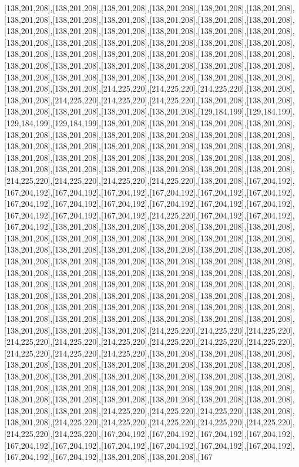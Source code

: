 [138,201,208],[138,201,208],[138,201,208],[138,201,208],[138,201,208],[138,201,208],[138,201,208],[138,201,208],[138,201,208],[138,201,208],[138,201,208],[138,201,208],[138,201,208],[138,201,208],[138,201,208],[138,201,208],[138,201,208],[138,201,208],[138,201,208],[138,201,208],[138,201,208],[138,201,208],[138,201,208],[138,201,208],[138,201,208],[138,201,208],[138,201,208],[138,201,208],[138,201,208],[138,201,208],[138,201,208],[138,201,208],[138,201,208],[138,201,208],[138,201,208],[138,201,208],[138,201,208],[138,201,208],[138,201,208],[138,201,208],[138,201,208],[138,201,208],[138,201,208],[138,201,208],[214,225,220],[214,225,220],[214,225,220],[138,201,208],[138,201,208],[214,225,220],[214,225,220],[214,225,220],[138,201,208],[138,201,208],[138,201,208],[138,201,208],[138,201,208],[138,201,208],[129,184,199],[129,184,199],[129,184,199],[129,184,199],[138,201,208],[138,201,208],[138,201,208],[138,201,208],[138,201,208],[138,201,208],[138,201,208],[138,201,208],[138,201,208],[138,201,208],[138,201,208],[138,201,208],[138,201,208],[138,201,208],[138,201,208],[138,201,208],[138,201,208],[138,201,208],[138,201,208],[138,201,208],[138,201,208],[138,201,208],[138,201,208],[138,201,208],[138,201,208],[138,201,208],[138,201,208],[138,201,208],[214,225,220],[214,225,220],[214,225,220],[214,225,220],[138,201,208],[167,204,192],[167,204,192],[167,204,192],[167,204,192],[167,204,192],[167,204,192],[167,204,192],[167,204,192],[167,204,192],[167,204,192],[167,204,192],[167,204,192],[167,204,192],[167,204,192],[167,204,192],[167,204,192],[214,225,220],[167,204,192],[167,204,192],[167,204,192],[138,201,208],[138,201,208],[138,201,208],[138,201,208],[138,201,208],[138,201,208],[138,201,208],[138,201,208],[138,201,208],[138,201,208],[138,201,208],[138,201,208],[138,201,208],[138,201,208],[138,201,208],[138,201,208],[138,201,208],[138,201,208],[138,201,208],[138,201,208],[138,201,208],[138,201,208],[138,201,208],[138,201,208],[138,201,208],[138,201,208],[138,201,208],[138,201,208],[138,201,208],[138,201,208],[138,201,208],[138,201,208],[138,201,208],[138,201,208],[138,201,208],[138,201,208],[138,201,208],[138,201,208],[138,201,208],[138,201,208],[138,201,208],[138,201,208],[138,201,208],[138,201,208],[138,201,208],[138,201,208],[138,201,208],[138,201,208],[138,201,208],[138,201,208],[138,201,208],[138,201,208],[138,201,208],[138,201,208],[138,201,208],[138,201,208],[214,225,220],[214,225,220],[214,225,220],[214,225,220],[214,225,220],[214,225,220],[214,225,220],[214,225,220],[214,225,220],[214,225,220],[214,225,220],[214,225,220],[138,201,208],[138,201,208],[138,201,208],[138,201,208],[138,201,208],[138,201,208],[138,201,208],[138,201,208],[138,201,208],[138,201,208],[138,201,208],[138,201,208],[138,201,208],[138,201,208],[138,201,208],[138,201,208],[138,201,208],[138,201,208],[138,201,208],[138,201,208],[138,201,208],[138,201,208],[138,201,208],[138,201,208],[138,201,208],[138,201,208],[138,201,208],[138,201,208],[138,201,208],[214,225,220],[214,225,220],[214,225,220],[138,201,208],[138,201,208],[214,225,220],[214,225,220],[214,225,220],[214,225,220],[214,225,220],[214,225,220],[214,225,220],[167,204,192],[167,204,192],[167,204,192],[167,204,192],[167,204,192],[167,204,192],[167,204,192],[167,204,192],[167,204,192],[167,204,192],[167,204,192],[167,204,192],[138,201,208],[138,201,208],[167